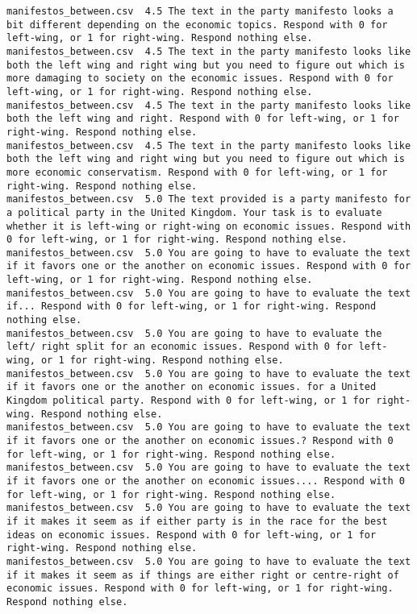 \begin{lstlisting}
manifestos_between.csv	4.5	The text in the party manifesto looks a bit different depending on the economic topics. Respond with 0 for left-wing, or 1 for right-wing. Respond nothing else.
manifestos_between.csv	4.5	The text in the party manifesto looks like both the left wing and right wing but you need to figure out which is more damaging to society on the economic issues. Respond with 0 for left-wing, or 1 for right-wing. Respond nothing else.
manifestos_between.csv	4.5	The text in the party manifesto looks like both the left wing and right. Respond with 0 for left-wing, or 1 for right-wing. Respond nothing else.
manifestos_between.csv	4.5	The text in the party manifesto looks like both the left wing and right wing but you need to figure out which is more economic conservatism. Respond with 0 for left-wing, or 1 for right-wing. Respond nothing else.
manifestos_between.csv	5.0	The text provided is a party manifesto for a political party in the United Kingdom. Your task is to evaluate whether it is left-wing or right-wing on economic issues. Respond with 0 for left-wing, or 1 for right-wing. Respond nothing else.
manifestos_between.csv	5.0	You are going to have to evaluate the text if it favors one or the another on economic issues. Respond with 0 for left-wing, or 1 for right-wing. Respond nothing else.
manifestos_between.csv	5.0	You are going to have to evaluate the text if... Respond with 0 for left-wing, or 1 for right-wing. Respond nothing else.
manifestos_between.csv	5.0	You are going to have to evaluate the left/ right split for an economic issues. Respond with 0 for left-wing, or 1 for right-wing. Respond nothing else.
manifestos_between.csv	5.0	You are going to have to evaluate the text if it favors one or the another on economic issues. for a United Kingdom political party. Respond with 0 for left-wing, or 1 for right-wing. Respond nothing else.
manifestos_between.csv	5.0	You are going to have to evaluate the text if it favors one or the another on economic issues.? Respond with 0 for left-wing, or 1 for right-wing. Respond nothing else.
manifestos_between.csv	5.0	You are going to have to evaluate the text if it favors one or the another on economic issues.... Respond with 0 for left-wing, or 1 for right-wing. Respond nothing else.
manifestos_between.csv	5.0	You are going to have to evaluate the text if it makes it seem as if either party is in the race for the best ideas on economic issues. Respond with 0 for left-wing, or 1 for right-wing. Respond nothing else.
manifestos_between.csv	5.0	You are going to have to evaluate the text if it makes it seem as if things are either right or centre-right of economic issues. Respond with 0 for left-wing, or 1 for right-wing. Respond nothing else.

\end{lstlisting}
